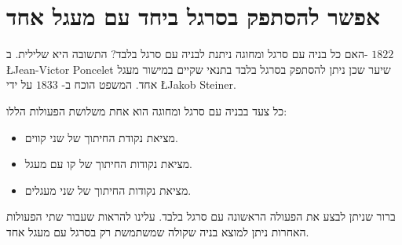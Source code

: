 

\chapter{אפשר להסתפק בסרגל ביחד עם מעגל אחד}\label{c.straightedge}



האם כל בניה עם סרגל ומחוגה ניתנת לבניה עם סרגל בלבד? התשובה היא שלילית. ב-%
$1822$
\L{Jean-Victor Poncelet}
שיער שכן ניתן להסתפק בסרגל בלבד בתנאי שקיים במישור מעגל אחד.
המשפט הוכח ב-%
$1833$
על ידי
\L{Jakob Steiner}.



כל צעד בבניה עם סרגל ומחוגה הוא אחת משלושת הפעולות הללו:
\begin{itemize}
\setlength{\itemsep}{0pt}
\item
מציאת נקודת החיתוך של שני קווים.
\item
מציאת נקודות החיתוך של קו עם מעגל.
\item
מציאת נקודות החיתוך של שני מעגלים.
\end{itemize}
ברור שניתן לבצע את הפעולה הראשונה עם סרגל בלבד. עלינו להראות שעבור שתי הפעולות האחרות ניתן למוצא בניה שקולה שמשתמשת רק בסרגל עם מעגל אחד.


